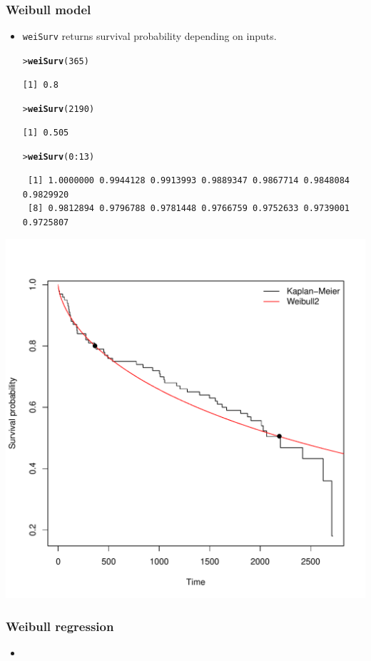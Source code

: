 \documentclass[10pt]{beamer}\usepackage[]{graphicx}\usepackage[]{color}
\makeatletter
\newcommand{\hlnum}[1]{\textcolor[rgb]{0.686,0.059,0.569}{#1}}%
\newcommand{\hlopt}[1]{\textcolor[rgb]{0,0,0}{#1}}%
\newcommand{\hlstd}[1]{\textcolor[rgb]{0.345,0.345,0.345}{#1}}%
\newcommand{\hlkwd}[1]{\textcolor[rgb]{0.737,0.353,0.396}{\textbf{#1}}}%
\newenvironment{kframe}{%
 \def\at@end@of@kframe{}%
 \ifinner\ifhmode%
  \def\at@end@of@kframe{\end{minipage}}%
  \begin{minipage}{\columnwidth}%
 \fi\fi%
 \def\FrameCommand##1{\hskip\@totalleftmargin \hskip-\fboxsep
 \colorbox{shadecolor}{##1}\hskip-\fboxsep
     \hskip-\linewidth \hskip-\@totalleftmargin \hskip\columnwidth}%
 \MakeFramed {\advance\hsize-\width
   \@totalleftmargin\z@ \linewidth\hsize
   \@setminipage}}%
 {\par\unskip\endMakeFramed%
 \at@end@of@kframe}
\newenvironment{knitrout}{}{} %
\renewenvironment{knitrout}{\setlength{\topsep}{-.2mm}}{}
\newcommand{\code}[1]{{\texttt{#1}}}
\makeatother
\begin{document}
\begin{frame}[fragile]
  \frametitle{Weibull model}
  \begin{itemize}
  \item \code{weiSurv} returns survival probability depending on inputs.
\begin{knitrout}\scriptsize
{}\color{fgcolor}\begin{kframe}
\begin{alltt}
\hlstd{> }\hlkwd{weiSurv}\hlstd{(}\hlnum{365}\hlstd{)}
\end{alltt}
\begin{verbatim}
[1] 0.8
\end{verbatim}
\begin{alltt}
\hlstd{> }\hlkwd{weiSurv}\hlstd{(}\hlnum{2190}\hlstd{)}
\end{alltt}
\begin{verbatim}
[1] 0.505
\end{verbatim}
\begin{alltt}
\hlstd{> }\hlkwd{weiSurv}\hlstd{(}\hlnum{0}\hlopt{:}\hlnum{13}\hlstd{)}
\end{alltt}
\begin{verbatim}
 [1] 1.0000000 0.9944128 0.9913993 0.9889347 0.9867714 0.9848084 0.9829920
 [8] 0.9812894 0.9796788 0.9781448 0.9766759 0.9752633 0.9739001 0.9725807
\end{verbatim}
\end{kframe}
\end{knitrout}
  \end{itemize}\vspace{-.75cm}
  \begin{center}
    \includegraphics[scale = .32]{Weibull2}
  \end{center}
\end{frame}

\begin{frame}[fragile]
  \frametitle{Weibull regression}
  \begin{itemize}
  \item 
  \end{itemize}
\end{frame}
\end{document}
